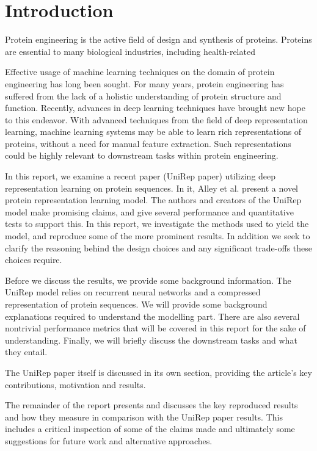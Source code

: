 \documentclass[a4paper,11pt]{article}
\begin{document}


\thispagestyle{empty}
\tableofcontents
\clearpage
\setcounter{page}{1}

\section{Introduction}

Protein engineering is the active field of design and synthesis of proteins. Proteins are essential to many biological industries, including health-related 

Effective usage of machine learning techniques on the domain of protein engineering has long been sought. For many years, protein engineering has suffered from the lack of a holistic understanding of protein structure and function. Recently, advances in deep learning techniques have brought new hope to this endeavor. With advanced techniques from the field of deep representation learning, machine learning systems may be able to learn rich representations of proteins, without a need for manual feature extraction. Such representations could be highly relevant to downstream tasks within protein engineering.

In this report, we examine a recent paper \cite{alley2019unified} (UniRep paper) utilizing deep representation learning on protein sequences. In it, Alley et al. present a novel protein representation learning model. The authors and creators of the UniRep model make promising claims, and give several performance and quantitative tests to support this. In this report, we investigate the methods used to yield the model, and reproduce some of the more prominent results. In addition we seek to clarify the reasoning behind the design choices and any significant trade-offs these choices require. 

Before we discuss the results, we provide some background information. The UniRep model relies on recurrent neural networks and a compressed representation of protein sequences. We will provide some background explanations required to understand the modelling part. There are also several nontrivial performance metrics that will be covered in this report for the sake of understanding. Finally, we will briefly discuss the downstream tasks and what they entail.

The UniRep paper itself is discussed in its own section, providing the article's key contributions, motivation and results.

The remainder of the report presents and discusses the key reproduced results and how they measure in comparison with the UniRep paper results. This includes a critical inspection of some of the claims made and ultimately some suggestions for future work and alternative approaches.
\end{document}
